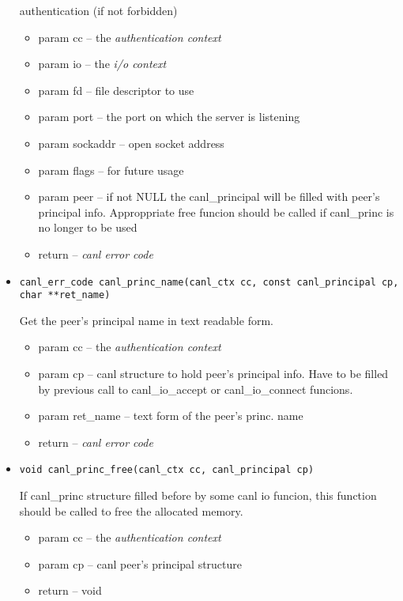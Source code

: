 \begin{itemize}
  authentication (if not forbidden)
  \begin{itemize}
    \item param cc -- the \textit{authentication context}
    \item param io -- the \textit{i/o context}
    \item param fd -- file descriptor to use
    \item param port -- the port on which the server is listening
    \item param sockaddr -- open socket address 
    \item param flags -- for future usage
    \item param peer -- if not NULL the canl\_principal will be filled with peer's principal info. Approppriate free funcion should be called if canl\_princ is no longer to be used
    \item return -- \textit{canl error code}
  \end{itemize}

  \item \begin{verbatim}canl_err_code canl_princ_name(canl_ctx cc, const canl_principal cp, char **ret_name)\end{verbatim}
  Get the peer's principal name in text readable form. 
  \begin{itemize}
    \item param cc -- the \textit{authentication context}
    \item param cp -- canl structure to hold peer's principal info. Have to be filled by previous call to canl\_io\_accept or canl\_io\_connect funcions.
    \item param ret\_name -- text form of the peer's princ. name 
    \item return -- \textit{canl error code}
  \end{itemize}

  \item \begin{verbatim}void canl_princ_free(canl_ctx cc, canl_principal cp)\end{verbatim}
  If canl\_princ structure filled before by some canl io funcion, this function should be called to free the allocated memory. 
  \begin{itemize}
    \item param cc -- the \textit{authentication context}
    \item param cp -- canl peer's principal structure
    \item return -- void
  \end{itemize}

\end{itemize}

